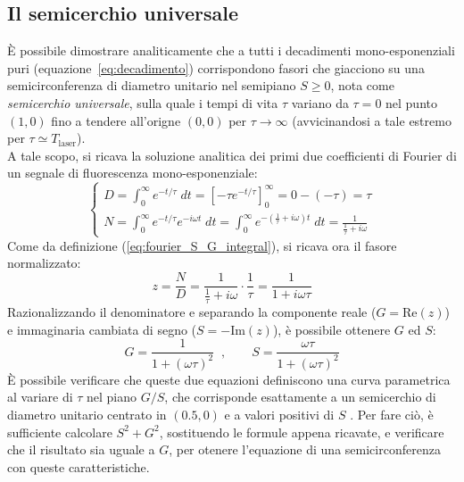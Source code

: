 \subsection{Il semicerchio universale} %

È possibile dimostrare analiticamente che a tutti i decadimenti mono-esponenziali puri (equazione~\ref{eq:decadimento}) corrispondono fasori che giacciono su una semicirconferenza di diametro unitario nel semipiano $S \ge 0$, nota come \textit{semicerchio universale}, sulla quale i tempi di vita $\tau$ variano da $\tau = 0$ nel punto $(1, 0)$ fino a tendere all'origne $(0, 0)$ per $\tau \to \infty$ (avvicinandosi a tale estremo per $\tau \simeq T_{\text{laser}}$).\\
A tale scopo, si ricava la soluzione analitica dei primi due coefficienti di Fourier di un segnale di fluorescenza mono-esponenziale:
\[
\begin{cases} 
    \displaystyle D = \int_0^\infty e^{-t/\tau} \;dt = \left[ -\tau e^{-t/\tau} \right]_0^\infty = 0 - (-\tau) = \tau \\[15pt]

    \displaystyle N = \int_0^\infty e^{-t/\tau} e^{-i\omega t}\; dt = \int_0^\infty e^{-\left(\frac{1}{\tau} + i\omega\right)t} \;dt = \frac{1}{\frac{1}{\tau} + i\omega}
\end{cases}
\]
Come da definizione (\ref{eq:fourier_S_G_integral}), si ricava ora il fasore normalizzato:
\begin{equation*}
    z = \frac{N}{D} = \frac{1}{\frac{1}{\tau}+i\omega}\cdot\frac{1}{\tau} = \frac{1}{1+i\omega\tau}
\end{equation*}
Razionalizzando il denominatore e separando la componente reale ($G = \text{Re}(z)$) e immaginaria cambiata di segno ($S = -\text{Im}(z)$), è possibile ottenere $G$ ed $S$:
\begin{equation}
    G = \frac{1}{1 + (\omega\tau)^2}\;\; , \qquad S = \frac{\omega\tau}{1 + (\omega\tau)^2}
    \label{eq:S_G_freq_domain}
\end{equation}
È possibile verificare che queste due equazioni definiscono una curva parametrica al variare di $\tau$ nel piano $G/S$, che corrisponde esattamente a un semicerchio di diametro unitario centrato in $(0.5, 0)$ e a valori positivi di $S$ \cite[Sez. 4.1.2]{lakowiczPrinciplesFluorescenceSpectroscopy2006}. Per fare ciò, è sufficiente calcolare $S^2 + G^2$, sostituendo le formule appena ricavate, e verificare che il risultato sia uguale a $G$, per otenere l'equazione di una semicirconferenza con queste caratteristiche.

